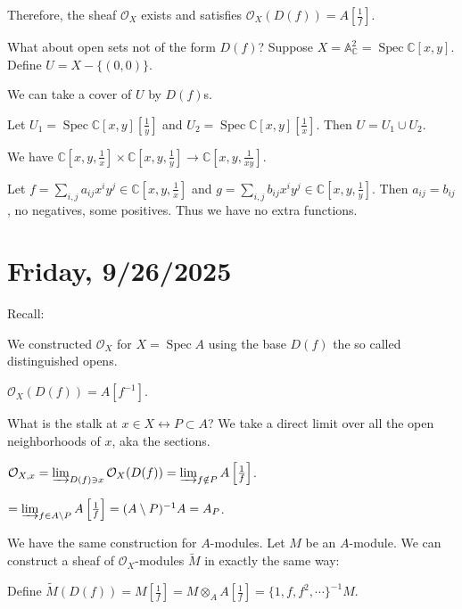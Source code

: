 \documentclass{article}
\theoremstyle{definition}
\begin{document}
    Therefore, the sheaf \(\mathcal{O}_X\) exists and satisfies \(\mathcal{O}_X(D(f)) = A \left[ \frac{1}{f} \right]\).

    What about open sets not of the form \(D(f)\)? Suppose \(X = \mathbb{A}^2_{\mathbb{C}} = \operatorname{Spec} \mathbb{C} [x,y]\). Define \(U = X - \{ (0,0) \}\).

    We can take a cover of \(U\) by \(D(f)\)s.
    
    Let \(U_1 = \operatorname{Spec} \mathbb{C} [x,y]\left[ \frac{1}{y} \right] \) and \(U_2 = \operatorname{Spec} \mathbb{C}[x,y]\left[ \frac{1}{x} \right]\). Then \(U = U_1 \cup U_2\).
    
    We have \(\mathbb{C} \left[ x, y, \frac{1}{x} \right] \times \mathbb{C} \left[ x,y,\frac{1}{y} \right] \to \mathbb{C}\left[ x,y,\frac{1}{xy} \right]\).
    
    Let \(f = \sum_{i,j} a_{ij} x^i y^j \in \mathbb{C} \left[ x,y,\frac{1}{x} \right]  \) and \(g = \sum_{i,j} b_{ij} x^i y^j \in \mathbb{C} \left[ x,y,\frac{1}{y} \right]\). Then \(a_{ij} = b_{ij}\), no negatives, some positives. Thus we have no extra functions.

    \section*{Friday, 9/26/2025}
    
    Recall:

    We constructed \(\mathcal{O}_X\) for \(X = \operatorname{Spec} A\) using the base \(D(f)\) the so called distinguished opens.

    \(\mathcal{O}_X(D(f)) = A[f ^{-1}]\).
    
    What is the stalk at \(x\in X \leftrightarrow P \subset A\)? We take a direct limit over all the open neighborhoods of \(x\), aka the sections.

    \(\mathcal{O}_{X,x} = \varinjlim_{D(f) \ni x} \mathcal{O}_X(D(f)) = \varinjlim_{f \notin P} A \left[ \frac{1}{f} \right]\).

    \(= \varinjlim_{f \in A \setminus P} A \left[ \frac{1}{f} \right] = (A \setminus P) ^{-1} A = A_P\).

    We have the same construction for \(A\)-modules. Let \(M\) be an \(A\)-module. We can construct a sheaf of \(\mathcal{O}_X\)-modules \(\widetilde{M}\) in exactly the same way:

    Define \(\widetilde{M}(D(f)) = M \left[ \frac{1}{f} \right] = M \otimes_A A \left[ \frac{1}{f} \right] = \{ 1, f, f^2, \cdots \}^{-1} M\).
    
\end{document}
